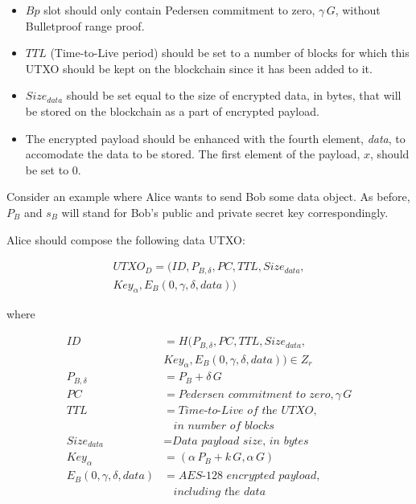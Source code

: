 \documentclass[8pt,fleqn,openany]{book}
\begin{document}
\begin{itemize}
  \item {$Bp$ slot should only contain Pedersen commitment to zero, $\gamma \, G$, without Bulletproof range proof.}
  \item {$TTL$ (Time-to-Live period) should be set to a number of blocks for which this UTXO should be kept on the blockchain since it has been added to it.}
  \item {$Size_{data}$ should be set equal to the size of encrypted data, in bytes, that will be stored on the blockchain as a part of encrypted payload.}
  \item {The encrypted payload should be enhanced with the fourth element, \textit{data}, to accomodate the data to be stored. The first element of the payload, $x$, should be set to 0.}
\end{itemize}

Consider an example where Alice wants to send Bob some data object. As before, $P_B$ and $s_B$ will stand for Bob's public and private secret key correspondingly. 

Alice should compose the following data UTXO:

\begin{multline*}
  UTXO_D = (ID, P_{B, \delta}, PC, TTL, Size_{data},\\
      Key_{\alpha}, E_B(0, \gamma, \delta, data))
\end{multline*}
  
  where
  
\begin{align*}
  ID &= H(P_{B, \delta}, PC, TTL, Size_{data}, \\ 
    & Key_{\alpha}, E_B(0, \gamma, \delta, data)) \in Z_r \\
  P_{B, \delta} &= P_B + \delta \, G \\
  PC &= \textit{Pedersen commitment to zero}, \gamma \, G \\
  TTL &= \textit{Time-to-Live of the UTXO},\\
  & \ \ \ \ \textit{in number of blocks} \\
  Size_{data} &= \textit{Data payload size, in bytes} \\
  Key_{\alpha} &= (\alpha \, P_{B} + k \, G, \alpha \, G ) \\
  E_B(0, \gamma, \delta, data) &= \textit{AES-128 encrypted payload}, \\
  & \ \ \ \ \textit{including the data}
\end{align*}
\end{document}
